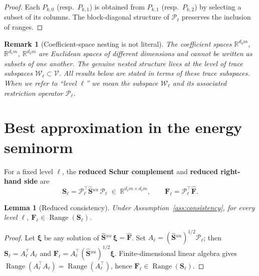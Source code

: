 \documentclass[11pt,a4paper]{article}
\newtheorem{lemma}[theorem]{Lemma}
\newtheorem{remark}[theorem]{Remark}
\theoremstyle{definition}
\newcommand{\R}{\mathbb{R}}
\newcommand{\Schur}{\mathbf{S}}
\newcommand{\Shatuu}{\widehat{\Schur}{}^{uu}}
\newcommand{\Fhat}{\widehat{\bm{F}}}
\newcommand{\Range}{\operatorname{Range}}
\newcommand{\Vspace}{\mathcal{V}}
\newcommand{\Wspace}{\mathcal{W}}
\newcommand{\Pcal}{\mathcal{P}}
\begin{document}
\begin{proof}
  Each $P_{k,0}$ (resp.\ $P_{k,1}$) is obtained from $P_{k,1}$
  (resp.\ $P_{k,2}$) by selecting a subset of its columns.
  The block-diagonal structure of $\Pcal_\ell$ preserves the inclusion
  of ranges.
\end{proof}

\begin{remark}[Coefficient-space nesting is not literal]\label{rem:coeff-nest}
  The coefficient spaces $\R^{d_0 m}$, $\R^{d_1 m}$, $\R^{d_2 m}$ are
  Euclidean spaces of different dimensions and cannot be written as
  subsets of one another.  The genuine nested structure lives at the
  level of \emph{trace subspaces} $\Wspace_\ell \subset \Vspace$.
  All results below are stated in terms of these trace subspaces.
  When we refer to ``level $\ell$'' we mean the subspace $\Wspace_\ell$
  and its associated restriction operator $\Pcal_\ell$.
\end{remark}

\section{Best approximation in the energy seminorm}

For a fixed level $\ell$, the \textbf{reduced Schur complement} and
\textbf{reduced right-hand side} are
\begin{equation}\label{eq:S-ell}
  \Schur_\ell = \Pcal_\ell^\top \Shatuu\, \Pcal_\ell
  \;\in\; \R^{d_\ell m \times d_\ell m},\qquad
  \bm{F}_\ell = \Pcal_\ell^\top \Fhat.
\end{equation}

\begin{lemma}[Reduced consistency]\label{lem:reduced-cons}
  Under Assumption~\ref{ass:consistency}, for
  every level $\ell$,
  $\bm{F}_\ell \in \Range(\Schur_\ell)$.
\end{lemma}

\begin{proof}
  Let $\bm{\xi}$ be any solution of $\Shatuu\,\bm{\xi} = \Fhat$.
  Set $A_\ell = (\Shatuu)^{1/2}\Pcal_\ell$; then
  $\Schur_\ell = A_\ell^\top A_\ell$ and
  $\bm{F}_\ell = A_\ell^\top (\Shatuu)^{1/2}\bm{\xi}$.
  Finite-dimensional linear algebra gives
  $\Range(A_\ell^\top A_\ell) = \Range(A_\ell^\top)$,
  hence $\bm{F}_\ell \in \Range(\Schur_\ell)$.
\end{proof}
\end{document}
